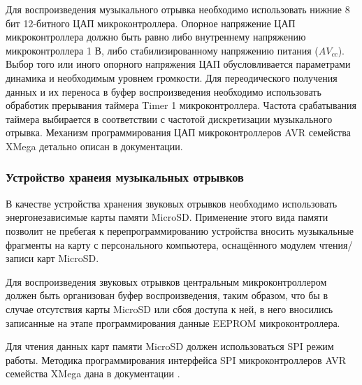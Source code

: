 \begin{par}
Для воспроизведения музыкального отрывка необходимо использовать нижние 8 бит 12-битного
ЦАП микроконтроллера. Опорное напряжение ЦАП микроконтроллера должно быть равно либо внутреннему
напряжению микроконтроллера 1 В, либо стабилизированному напряжению питания ($AV_{cc}$). Выбор того или иного
опорного напряжения ЦАП обусловливается параметрами динамика и необходимым уровнем громкости.
Для переодического получения данных и их переноса в буфер воспроизведения необходимо использовать
обработик прерывания таймера Timer 1 микроконтроллера. Частота срабатывания таймера выбирается
в соответствии с частотой дискретизации музыкального отрывка.
Механизм программирования ЦАП микроконтроллеров AVR семейства XMega детально описан в документации\cite{avrdac}.
\end{par}


\subsubsection{Устройство хранеия музыкальных отрывков}
\begin{par}
В качестве устройства хранения звуковых отрывков необходимо использовать энергонезависимые карты
памяти MicroSD. Применение этого вида памяти позволит не пребегая к перепрограммированию устройства
вносить музыкальные фрагменты на карту с персонального компьютера, оснащённого модулем
чтения/записи карт MicroSD.
\end{par}

\begin{par}
Для воспроизведения звуковых отрывков центральным микроконтроллером должен быть
организован буфер воспроизведения, таким образом, что бы в случае отсутствия карты MicroSD или
сбоя доступа к ней, в него вносились записанные на этапе программирования данные EEPROM микроконтроллера.
\end{par}

\begin{par}
Для чтения данных карт памяти MicroSD должен использоваться SPI режим работы. Методика программирования
интерфейса SPI микроконтроллеров AVR семейства XMega дана в документации \cite{avrspi}.
\end{par}

